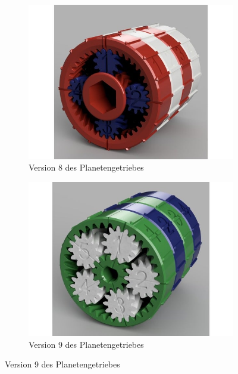 \begin{figure}[!ht]
	\centering
	\begin{subfigure}[b]{0.4\textwidth}
		\includegraphics[width=\textwidth]{bilder/GetriebeVersion5-1.jpg}
		\caption{Version 8 des Planetengetriebes \cite{link:planetgear5-1}}
		\label{bild:gearversion5-1}
	\end{subfigure}
	\begin{subfigure}[b]{0.4\textwidth}
		\includegraphics[width=\textwidth]{bilder/GetriebeVersion5-2.jpg}
		\caption{Version 9 des Planetengetriebes \cite{link:planetgear5-2}}
		\label{bild:gearversion5-2}
	\end{subfigure}
\end{figure}

